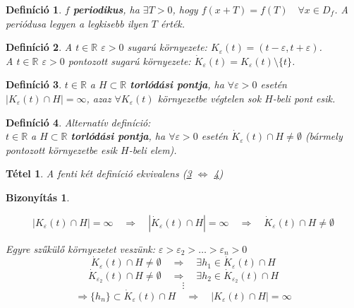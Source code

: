 \documentclass[a4paper,12pt,twoside]{book}
\newtheorem{tetel}{Tétel}[chapter]
\newtheorem{defi}{Definíció}[chapter]
\theoremstyle{break}
\newtheorem{defiNL}[defi]{Definíció}
\newtheorem{biz}{Bizonyítás}[chapter]
\theoremstyle{plain}
\begin{document}
\begin{defi}
 $f$ \textbf{periodikus}, ha $\exists T>0$, hogy $f(x+T)=f(T) \quad \forall x\in D_f$. A periódusa legyen a legkisebb ilyen $T$ érték.
\end{defi}

\begin{defiNL}
 A $t\in\mathbb{R}$ $\varepsilon>0$ sugarú környezete: $K_\varepsilon(t) = (t-\varepsilon, t+\varepsilon)$.\\
 A $t\in\mathbb{R}$ $\varepsilon>0$ pontozott sugarú környezete: $\dot{K}_\varepsilon(t) = K_\varepsilon(t)\setminus\{t\}$.\\
\end{defiNL}

\begin{defi}\label{Torlodasi1}
 $t\in\mathbb{R}$ a $H\subset \mathbb{R}$ \textbf{torlódási pontja}, ha $\forall\varepsilon>0$ esetén $|K_\varepsilon(t)\cap H|=\infty$, azaz $\forall K_\varepsilon(t)$ környezetbe végtelen sok $H$-beli pont esik.
\end{defi}

\begin{defi}\label{Torlodasi2}Alternatív definíció:\\
 $t\in\mathbb{R}$ a $H\subset\mathbb{R}$ \textbf{torlódási pontja}, ha $\forall\varepsilon>0$ esetén $\dot{K}_\varepsilon(t)\cap H\neq \emptyset$ (bármely pontozott környezetbe esik $H$-beli elem).
\end{defi}

\begin{tetel}
 A fenti két definíció ekvivalens (\ref{Torlodasi1} $\Leftrightarrow$ \ref{Torlodasi2})
\end{tetel}
\begin{biz}
 \begin{description*}
  \item[\ref{Torlodasi1} $\Rightarrow$ \ref{Torlodasi2}] 
    \[|K_\varepsilon(t)\cap H|=\infty \quad \Rightarrow \quad |\dot{K}_\varepsilon(t)\cap H|=\infty \quad \Rightarrow \quad \dot{K}_\varepsilon(t)\cap H \neq \emptyset\]
  \item[\ref{Torlodasi2} $\Rightarrow$ \ref{Torlodasi1}] 
    Egyre szűkülő környezetet veszünk: $\varepsilon > \varepsilon_2 > \ldots > \varepsilon_n > 0$
    \[\dot{K}_{\varepsilon}(t)\cap H \neq \emptyset \quad \Rightarrow \quad \exists h_1\in\dot{K}_{\varepsilon}(t)\cap H\]
    \[\dot{K}_{\varepsilon_2}(t)\cap H \neq \emptyset \quad \Rightarrow \quad \exists h_2\in\dot{K}_{\varepsilon_2}(t)\cap H\]
    \[\vdots\]
    \[\Longrightarrow \{h_n\}\subset\dot{K}_{\varepsilon}(t)\cap H \quad \Rightarrow \quad |K_\varepsilon(t)\cap H|=\infty\]
 \end{description*}
\end{biz}
\end{document}
